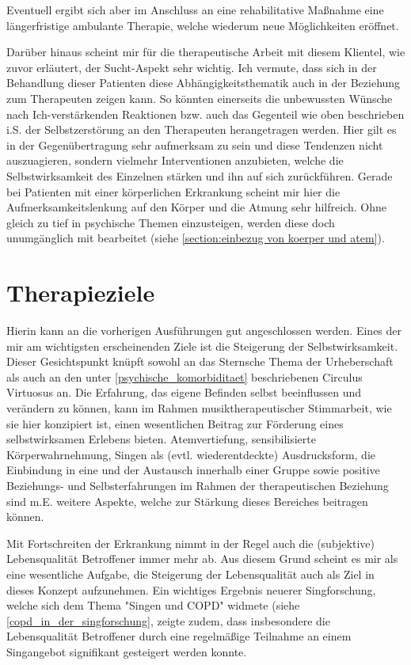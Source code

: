 Eventuell ergibt sich aber im Anschluss an eine rehabilitative Maßnahme eine längerfristige ambulante Therapie, welche wiederum neue Möglichkeiten eröffnet. 

Darüber hinaus scheint mir für die therapeutische Arbeit mit diesem Klientel, wie zuvor erläutert, der Sucht-Aspekt sehr wichtig. Ich vermute, dass sich in der Behandlung dieser Patienten diese Abhängigkeitsthematik auch in der Beziehung zum Therapeuten zeigen kann. So könnten einerseits die unbewussten Wünsche nach Ich-verstärkenden Reaktionen bzw. auch das Gegenteil wie oben beschrieben i.S. der Selbstzerstörung an den Therapeuten herangetragen werden. Hier gilt es in der Gegenübertragung sehr aufmerksam zu sein und diese Tendenzen nicht auszuagieren, sondern vielmehr Interventionen anzubieten, welche die Selbstwirksamkeit des Einzelnen stärken und ihn auf sich zurückführen. Gerade bei Patienten mit einer körperlichen Erkrankung scheint mir hier die Aufmerksamkeitslenkung auf den Körper und die Atmung sehr hilfreich. Ohne gleich zu tief in psychische Themen einzusteigen, werden diese doch unumgänglich mit bearbeitet (siehe \ref{section:einbezug von koerper und atem}). 

\section{Therapieziele}
Hierin kann an die vorherigen Ausführungen gut angeschlossen werden. Eines der mir am wichtigsten erscheinenden Ziele ist die Steigerung der Selbstwirksamkeit. Dieser Gesichtspunkt knüpft sowohl an das Sternsche Thema der Urheberschaft als auch an den unter \ref{psychische_komorbiditaet} beschriebenen Circulus Virtuosus an. Die Erfahrung, das eigene Befinden selbst beeinflussen und verändern zu können, kann im Rahmen musiktherapeutischer Stimmarbeit, wie sie hier konzipiert ist, einen wesentlichen Beitrag zur Förderung eines selbstwirksamen Erlebens bieten. Atemvertiefung, sensibilisierte Körperwahrnehmung, Singen als (evtl. wiederentdeckte) Ausdrucksform, die Einbindung in eine und der Austausch innerhalb einer Gruppe sowie positive Beziehungs- und Selbsterfahrungen im Rahmen der therapeutischen Beziehung sind m.E. weitere Aspekte, welche zur Stärkung dieses Bereiches beitragen können. %

Mit Fortschreiten der Erkrankung nimmt in der Regel auch die (subjektive) Lebensqualität Betroffener immer mehr ab. Aus diesem Grund scheint es mir als eine wesentliche Aufgabe, die Steigerung der Lebensqualität auch als Ziel in dieses Konzept aufzunehmen. Ein wichtiges Ergebnis neuerer Singforschung, welche sich dem Thema "Singen und COPD" widmete (siehe \ref{copd_in_der_singforschung}, zeigte zudem, dass insbesondere die Lebensqualität Betroffener durch eine regelmäßige Teilnahme an einem Singangebot signifikant gesteigert werden konnte. 

